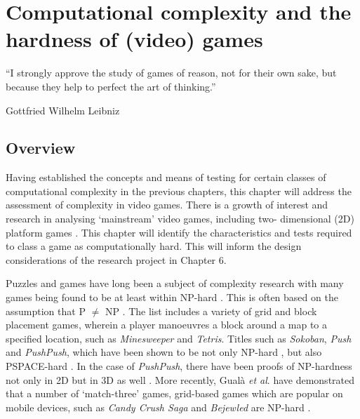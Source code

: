 \documentclass[11pt, a4paper, oneside]{report} %
\begin{document}



\chapter{Computational complexity and the hardness of (video) games}

\epigraph{``I strongly approve the study of games of reason, not for their own sake, but because they help to perfect the art of thinking.''}{Gottfried Wilhelm Leibniz}

\section{Overview}

Having established the concepts and means of testing for certain classes of computational complexity
in the previous chapters, this chapter will address the assessment of complexity in video games.
There is a growth of interest and research in analysing `mainstream' video games, including two-
dimensional (2D) platform games  \cite{viglietta2014gaming, DBLP:conf/fun/Forisek10, Aloupis2012,
Smith:2008:FAP:1401843.1401858}. This chapter will identify the characteristics and tests required
to class a game as computationally hard. This will inform the design considerations of the research
project in Chapter 6.

Puzzles and games have long been a subject of complexity research with many games being found to be
at least within NP-hard \cite{kendall2008survey}. This is often based on the assumption that P
$\neq$ NP \cite{demaine2001playing}. The list includes a variety of grid and block placement games,
wherein a player manoeuvres a block around a map to a specified location, such as
\textit{Minesweeper}\cite{kaye2000minesweeper} and \textit{Tetris}\cite{demaine2003tetris}. Titles
such as \textit{Sokoban}, \textit{Push} and \textit{PushPush}, which have been shown to be not only
NP-hard \cite{demaine2000pushpush}, but also PSPACE-hard \cite{culberson1999sokoban,
dor1999sokoban}. In the case of \textit{PushPush}, there have been proofs of NP-hardness not only in
2D but in 3D as well \cite{o1999pushpush}. More recently, Gual\`{a} \textit{et al}. have
demonstrated that a number of `match-three' games, grid-based games which are popular on mobile
devices, such as \textit{Candy Crush Saga} and \textit{Bejewled} are NP-hard
\cite{DBLP:journals/corr/GualaLN14}.
\end{document}
